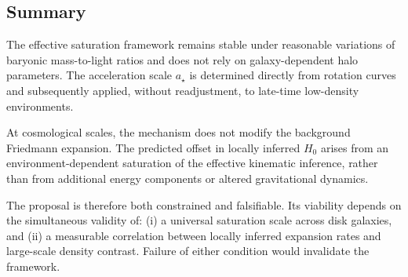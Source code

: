 \subsection{Summary}
  \label{subsec:robustness_summary}

  The effective saturation framework remains stable under reasonable
  variations of baryonic mass-to-light ratios and does not rely on
  galaxy-dependent halo parameters.
  The acceleration scale $a_\star$ is determined directly from
  rotation curves and subsequently applied, without readjustment,
  to late-time low-density environments.

  At cosmological scales, the mechanism does not modify the background
  Friedmann expansion.
  The predicted offset in locally inferred $H_0$ arises from an
  environment-dependent saturation of the effective kinematic inference,
  rather than from additional energy components or altered gravitational
  dynamics.

  The proposal is therefore both constrained and falsifiable.
  Its viability depends on the simultaneous validity of:
  (i) a universal saturation scale across disk galaxies,
  and
  (ii) a measurable correlation between locally inferred expansion rates
  and large-scale density contrast.
  Failure of either condition would invalidate the framework.
